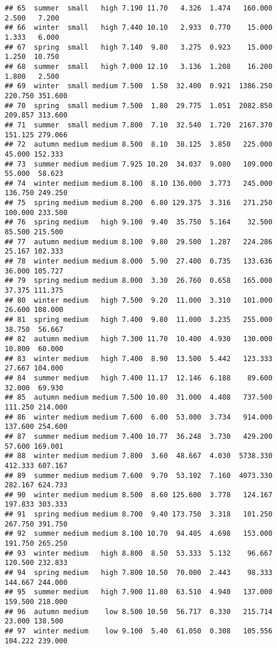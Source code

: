 \documentclass[
]{article}
\begin{document}
\begin{verbatim}
## 65  summer  small   high 7.190 11.70   4.326  1.474   160.000   2.500   7.200
## 66  winter  small   high 7.440 10.10   2.933  0.770    15.000   1.333   6.000
## 67  spring  small   high 7.140  9.80   3.275  0.923    15.000   1.250  10.750
## 68  summer  small   high 7.000 12.10   3.136  1.208    16.200   1.800   2.500
## 69  winter  small medium 7.500  1.50  32.400  0.921  1386.250 220.750 351.600
## 70  spring  small medium 7.500  1.80  29.775  1.051  2082.850 209.857 313.600
## 71  summer  small medium 7.800  7.10  32.540  1.720  2167.370 151.125 279.066
## 72  autumn medium medium 8.500  8.10  38.125  3.850   225.000  45.000 152.333
## 73  summer medium medium 7.925 10.20  34.037  9.080   109.000  55.000  58.623
## 74  winter medium medium 8.100  8.10 136.000  3.773   245.000 136.750 249.250
## 75  spring medium medium 8.200  6.80 129.375  3.316   271.250 100.000 233.500
## 76  spring medium   high 9.100  9.40  35.750  5.164    32.500  85.500 215.500
## 77  autumn medium medium 8.100  9.80  29.500  1.287   224.286  25.167 102.333
## 78  winter medium medium 8.000  5.90  27.400  0.735   133.636  36.000 105.727
## 79  spring medium medium 8.000  3.30  26.760  0.658   165.000  37.375 111.375
## 80  winter medium   high 7.500  9.20  11.000  3.310   101.000  26.600 108.000
## 81  spring medium   high 7.400  9.80  11.000  3.235   255.000  38.750  56.667
## 82  autumn medium   high 7.300 11.70  10.400  4.930   130.000  10.800  60.000
## 83  winter medium   high 7.400  8.90  13.500  5.442   123.333  27.667 104.000
## 84  summer medium   high 7.400 11.17  12.146  6.188    89.600  32.000  69.930
## 85  autumn medium medium 7.500 10.80  31.000  4.408   737.500 111.250 214.000
## 86  winter medium medium 7.600  6.00  53.000  3.734   914.000 137.600 254.600
## 87  summer medium medium 7.400 10.77  36.248  3.730   429.200  57.600 169.001
## 88  winter medium medium 7.800  3.60  48.667  4.030  5738.330 412.333 607.167
## 89  summer medium medium 7.600  9.70  53.102  7.160  4073.330 282.167 624.733
## 90  winter medium medium 8.500  8.60 125.600  3.778   124.167 197.833 303.333
## 91  spring medium medium 8.700  9.40 173.750  3.318   101.250 267.750 391.750
## 92  summer medium medium 8.100 10.70  94.405  4.698   153.000 191.750 265.250
## 93  winter medium   high 8.800  8.50  53.333  5.132    96.667 120.500 232.833
## 94  spring medium   high 7.800 10.50  70.000  2.443    98.333 144.667 244.000
## 95  summer medium   high 7.900 11.80  63.510  4.940   137.000 159.500 218.000
## 96  autumn medium    low 8.500 10.50  56.717  0.330   215.714  23.000 138.500
## 97  winter medium    low 9.100  5.40  61.050  0.308   105.556 104.222 239.000

\end{verbatim}
\end{document}
